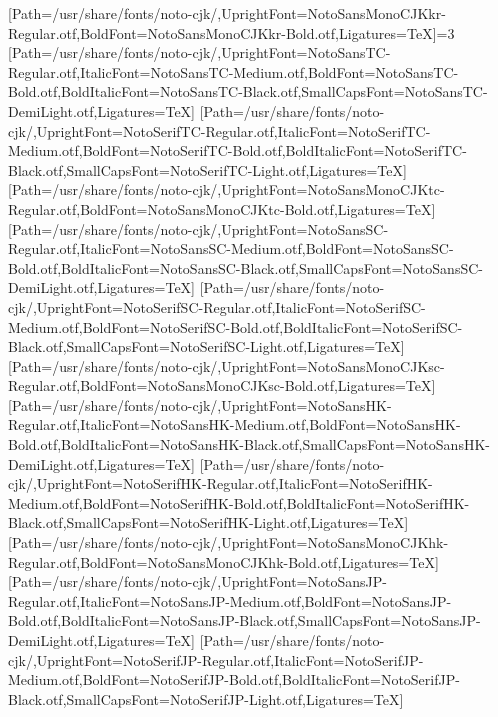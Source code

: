 \newfontfamily{}[Path=/usr/share/fonts/noto-cjk/,UprightFont=NotoSansMonoCJKkr-Regular.otf,BoldFont=NotoSansMonoCJKkr-Bold.otf,Ligatures=TeX]\else\ifnum\value{NotoCJKFamily}=3
\newfontfamily{}[Path=/usr/share/fonts/noto-cjk/,UprightFont=NotoSansTC-Regular.otf,ItalicFont=NotoSansTC-Medium.otf,BoldFont=NotoSansTC-Bold.otf,BoldItalicFont=NotoSansTC-Black.otf,SmallCapsFont=NotoSansTC-DemiLight.otf,Ligatures=TeX]
\newfontfamily{}[Path=/usr/share/fonts/noto-cjk/,UprightFont=NotoSerifTC-Regular.otf,ItalicFont=NotoSerifTC-Medium.otf,BoldFont=NotoSerifTC-Bold.otf,BoldItalicFont=NotoSerifTC-Black.otf,SmallCapsFont=NotoSerifTC-Light.otf,Ligatures=TeX]
\newfontfamily{}[Path=/usr/share/fonts/noto-cjk/,UprightFont=NotoSansMonoCJKtc-Regular.otf,BoldFont=NotoSansMonoCJKtc-Bold.otf,Ligatures=TeX]
\newfontfamily{}[Path=/usr/share/fonts/noto-cjk/,UprightFont=NotoSansSC-Regular.otf,ItalicFont=NotoSansSC-Medium.otf,BoldFont=NotoSansSC-Bold.otf,BoldItalicFont=NotoSansSC-Black.otf,SmallCapsFont=NotoSansSC-DemiLight.otf,Ligatures=TeX]
\newfontfamily{}[Path=/usr/share/fonts/noto-cjk/,UprightFont=NotoSerifSC-Regular.otf,ItalicFont=NotoSerifSC-Medium.otf,BoldFont=NotoSerifSC-Bold.otf,BoldItalicFont=NotoSerifSC-Black.otf,SmallCapsFont=NotoSerifSC-Light.otf,Ligatures=TeX]
\newfontfamily{}[Path=/usr/share/fonts/noto-cjk/,UprightFont=NotoSansMonoCJKsc-Regular.otf,BoldFont=NotoSansMonoCJKsc-Bold.otf,Ligatures=TeX]
\newfontfamily{}[Path=/usr/share/fonts/noto-cjk/,UprightFont=NotoSansHK-Regular.otf,ItalicFont=NotoSansHK-Medium.otf,BoldFont=NotoSansHK-Bold.otf,BoldItalicFont=NotoSansHK-Black.otf,SmallCapsFont=NotoSansHK-DemiLight.otf,Ligatures=TeX]
\newfontfamily{}[Path=/usr/share/fonts/noto-cjk/,UprightFont=NotoSerifHK-Regular.otf,ItalicFont=NotoSerifHK-Medium.otf,BoldFont=NotoSerifHK-Bold.otf,BoldItalicFont=NotoSerifHK-Black.otf,SmallCapsFont=NotoSerifHK-Light.otf,Ligatures=TeX]
\newfontfamily{}[Path=/usr/share/fonts/noto-cjk/,UprightFont=NotoSansMonoCJKhk-Regular.otf,BoldFont=NotoSansMonoCJKhk-Bold.otf,Ligatures=TeX]
\newfontfamily{}[Path=/usr/share/fonts/noto-cjk/,UprightFont=NotoSansJP-Regular.otf,ItalicFont=NotoSansJP-Medium.otf,BoldFont=NotoSansJP-Bold.otf,BoldItalicFont=NotoSansJP-Black.otf,SmallCapsFont=NotoSansJP-DemiLight.otf,Ligatures=TeX]
\newfontfamily{}[Path=/usr/share/fonts/noto-cjk/,UprightFont=NotoSerifJP-Regular.otf,ItalicFont=NotoSerifJP-Medium.otf,BoldFont=NotoSerifJP-Bold.otf,BoldItalicFont=NotoSerifJP-Black.otf,SmallCapsFont=NotoSerifJP-Light.otf,Ligatures=TeX]
